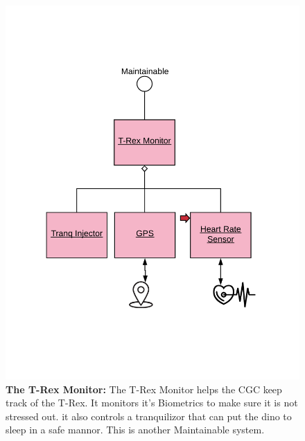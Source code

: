 \documentclass[12pt]{article}
\begin{document}
\begin{figure}[H]
    \centerline{\includegraphics[scale=.20]{TRexMonitor.png}}
    \caption{\textbf{The T-Rex Monitor: }The T-Rex Monitor  helps the CGC keep track of the T-Rex. 
It monitors it's Biometrics to make sure it is not stressed out. it also controls a tranquilizor 
that can put the dino to sleep in a safe mannor. This is another Maintainable system. }
    \label{fig:TRexMonitor}
\end{figure}
\end{document}

